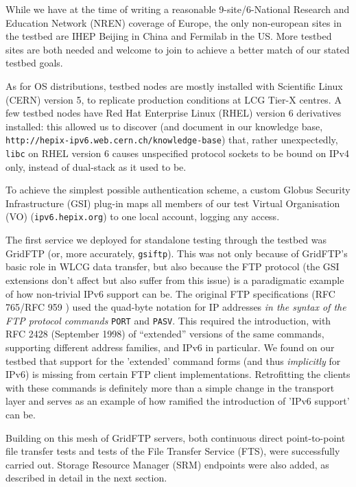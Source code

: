 While we have at the time of writing a reasonable
9-site/6-National Research and Education Network (NREN) coverage of Europe, the only non-european sites in the testbed
are IHEP Beijing in China and Fermilab in the US. More testbed sites are both needed and welcome to join 
to achieve a better match of our stated testbed goals.
\par
As for OS distributions, testbed nodes are mostly installed with 
Scientific Linux (CERN) version 5,
to replicate production conditions at LCG Tier-X centres. A few testbed nodes
have Red Hat Enterprise Linux (RHEL) \cite{rhel} version 6 derivatives installed: this allowed us to discover 
(and document in our knowledge base, {\tt http://hepix-ipv6.web.cern.ch/knowledge-base})
that, rather unexpectedly, {\tt libc} on RHEL version 6 causes unspecified 
protocol sockets to be bound on IPv4 only, instead of dual-stack 
as it used to be.
\par
To achieve the simplest possible authentication scheme, a custom Globus
Security Infrastructure (GSI)
plug-in maps all members of our test Virtual Organisation (VO) ({\tt ipv6.hepix.org}) to one
local account, logging any access. 
\par
The first service we deployed for standalone testing through the testbed was
GridFTP (or, more accurately, {\tt gsiftp}). 
This was not only because of GridFTP's basic role in WLCG data
transfer, but also because the FTP protocol (the GSI extensions don't 
affect but also suffer from this issue) is a paradigmatic example of 
how non-trivial IPv6 support can be. The original FTP specifications 
(RFC 765/RFC 959 \cite{rfc}) used the quad-byte notation for IP addresses 
{\em in the syntax of the FTP protocol commands} {\tt PORT} and {\tt PASV}.
This required the introduction, with RFC 2428 (September 1998) \cite{rfc} of
``extended'' versions of the same commands, supporting different address
families, and IPv6 in particular. We found on our testbed that support for 
the 'extended' command forms (and thus {\em implicitly} for IPv6)
is missing from certain FTP client implementations. Retrofitting the
clients with these commands is definitely more than a simple change in
the transport layer and serves as an example of how ramified the
introduction of 'IPv6 support' can be.
\par
Building on this mesh of GridFTP servers, both continuous direct point-to-point 
file transfer tests and tests of the File Transfer Service 
(FTS), were successfully carried out. Storage Resource Manager (SRM) endpoints
were also added, as described in detail in the next section.
